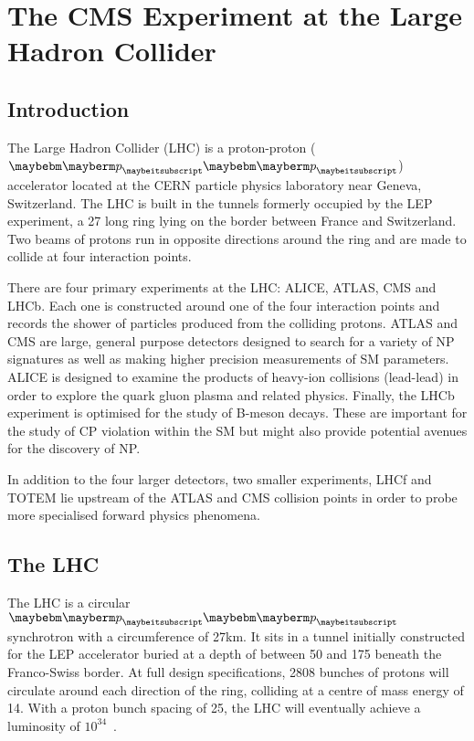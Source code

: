 \chapter{The CMS Experiment at the Large Hadron Collider}
\label{sec:experiment}
\section{Introduction}
The Large Hadron Collider (LHC) is a proton-proton ($\Pp\Pp$) accelerator
located at the CERN particle physics laboratory near Geneva, Switzerland. The
LHC is built in the tunnels formerly occupied by the \ac{LEP} experiment, a
\unit{27}{\kilo\metre} long ring lying on the border between France and
Switzerland. Two beams of protons run in opposite directions around the ring and
are made to collide at four interaction points.

There are four primary experiments at the LHC: \ac{ALICE}, \ac{ATLAS}, \ac{CMS}
and \ac{LHCb}. Each one is constructed around one of the four interaction points
and records the shower of particles produced from the colliding protons. ATLAS
and CMS are large, general purpose detectors designed to search for a variety of
\ac{NP} signatures as well as making higher precision measurements of \ac{SM}
parameters. \ac{ALICE} is designed to examine the products of heavy-ion
collisions (lead-lead) in order to explore the quark gluon plasma and related
physics. Finally, the \ac{LHCb} experiment is optimised for the study of B-meson
decays. These are important for the study of CP violation within the \ac{SM} but
might also provide potential avenues for the discovery of \ac{NP}.

In addition to the four larger detectors, two smaller experiments, \ac{LHCf} and
\ac{TOTEM} lie upstream of the \ac{ATLAS} and \ac{CMS} collision points in order
to probe more specialised forward physics phenomena.

\section{The \acl{LHC}}
The \ac{LHC} is a circular $\Pp\Pp$ synchrotron with a circumference of
\unit{27}{km}. It sits in a tunnel initially constructed for the \ac{LEP}
accelerator buried at a depth of between 50 and \unit{175}{\metre} beneath the
Franco-Swiss border. At full design specifications, 2808 bunches of protons will
circulate around each direction of the ring, colliding at a centre of mass
energy of \unit{14}{\TeV}. With a proton bunch spacing of
\unit{25}{\ns}, the \ac{LHC} will eventually achieve a luminosity of
\unit{$10^{34}$}{\rpsquare{\centi\metre}\usk\reciprocal\second}.

